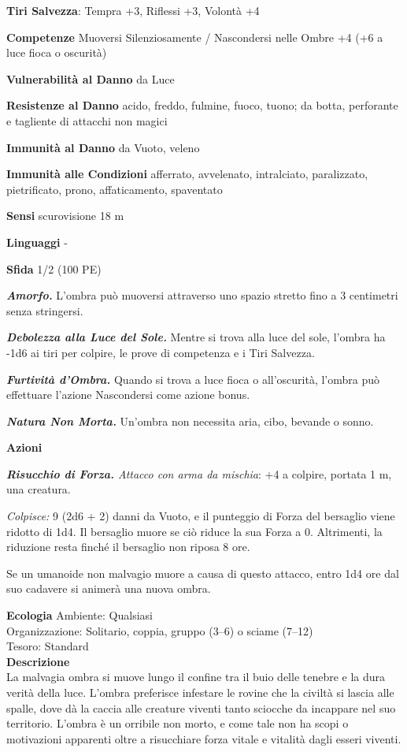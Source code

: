 \begin{multicols}{2}
\textbf{Tiri Salvezza}: Tempra +3, Riflessi +3, Volontà +4

\textbf{Competenze} Muoversi Silenziosamente / Nascondersi nelle Ombre +4 (+6 a luce fioca o oscurità)

\textbf{Vulnerabilità al Danno} da Luce

\textbf{Resistenze al Danno} acido, freddo, fulmine, fuoco, tuono; da botta, perforante e tagliente di attacchi non magici

\textbf{Immunità al Danno} da Vuoto, veleno

\textbf{Immunità alle Condizioni} afferrato, avvelenato, intralciato, paralizzato, pietrificato, prono, affaticamento, spaventato

\textbf{Sensi} scurovisione 18 m

\textbf{Linguaggi} -

\textbf{Sfida} 1/2 (100 PE)

\emph{\textbf{Amorfo.}} L'ombra può muoversi attraverso uno spazio stretto fino a 3 centimetri senza stringersi.

\emph{\textbf{Debolezza alla Luce del Sole.}} Mentre si trova alla luce del sole, l'ombra ha -1d6 ai tiri per colpire, le prove di competenza e i Tiri Salvezza.

\emph{\textbf{Furtività d'Ombra.}} Quando si trova a luce fioca o all'oscurità, l'ombra può effettuare l'azione Nascondersi come azione bonus. 

\emph{\textbf{Natura Non Morta.}} Un'ombra non necessita aria, cibo, bevande o sonno.

\textbf{Azioni}

\emph{\textbf{Risucchio di Forza.} Attacco con arma da mischia}: +4 a colpire, portata 1 m, una creatura.

\emph{Colpisce:} 9 (2d6 + 2) danni da Vuoto, e il punteggio di Forza del bersaglio viene ridotto di 1d4. Il bersaglio muore se ciò riduce la sua Forza a 0. Altrimenti, la riduzione resta finché il bersaglio non riposa 8 ore.

Se un umanoide non malvagio muore a causa di questo attacco, entro 1d4 ore dal suo cadavere si animerà una nuova ombra.

\textbf{Ecologia}
Ambiente: Qualsiasi\\
Organizzazione: Solitario, coppia, gruppo (3–6) o sciame (7–12)\\
Tesoro: Standard\\

\textbf{Descrizione}\\
La malvagia ombra si muove lungo il confine tra il buio delle tenebre e la dura verità della luce. L’ombra preferisce infestare le rovine che la civiltà si lascia alle spalle, dove dà la caccia alle creature viventi tanto sciocche da incappare nel suo territorio. L’ombra è un orribile non morto, e come tale non ha scopi o motivazioni apparenti oltre a risucchiare forza vitale e vitalità dagli esseri viventi.



\end{multicols}
